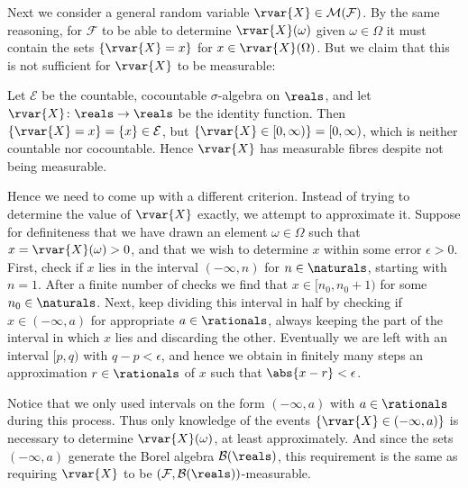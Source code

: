 \documentclass[article, a4paper, 11pt, oneside]{memoir}
\numberwithin{equation}{chapter}
\newcommand{\calB}{\mathcal{B}}
\newcommand{\calE}{\mathcal{E}}
\newcommand{\calF}{\mathcal{F}}
\newcommand{\borel}[1]{\calB(#1)}
\begin{document}
Next we consider a general random variable $\rvar{X} \in \meas{\calF}$. By the same reasoning, for $\calF$ to be able to determine $\rvar{X}(\omega)$ given $\omega \in \Omega$ it must contain the sets $\{\rvar{X} = x\}$ for $x \in \rvar{X}(\Omega)$. But we claim that this is not sufficient for $\rvar{X}$ to be measurable:
%
\begin{example}
    Let $\calE$ be the countable, cocountable $\sigma$-algebra on $\reals$, and let $\rvar{X} \colon \reals \to \reals$ be the identity function. Then $\{\rvar{X} = x\} = \{x\} \in \calE$, but $\{\rvar{X} \in [0,\infty)\} = [0, \infty)$, which is neither countable nor cocountable. Hence $\rvar{X}$ has measurable fibres despite not being measurable.
\end{example}
%
Hence we need to come up with a different criterion. Instead of trying to determine the value of $\rvar{X}$ exactly, we attempt to approximate it. Suppose for definiteness that we have drawn an element $\omega \in \Omega$ such that $x = \rvar{X}(\omega) > 0$, and that we wish to determine $x$ within some error $\epsilon > 0$. First, check if $x$ lies in the interval $(-\infty,n)$ for $n \in \naturals$, starting with $n = 1$. After a finite number of checks we find that $x \in [n_0, n_0+1)$ for some $n_0 \in \naturals$. Next, keep dividing this interval in half by checking if $x \in (-\infty, a)$ for appropriate $a \in \rationals$, always keeping the part of the interval in which $x$ lies and discarding the other. Eventually we are left with an interval $[p,q)$ with $q-p < \epsilon$, and hence we obtain in finitely many steps an approximation $r \in \rationals$ of $x$ such that $\abs{x-r} < \epsilon$.

Notice that we only used intervals on the form $(-\infty, a)$ with $a \in \rationals$ during this process. Thus only knowledge of the events $\{\rvar{X} \in (-\infty, a)\}$ is necessary to determine $\rvar{X}(\omega)$, at least approximately. And since the sets $(-\infty, a)$ generate the Borel algebra $\borel{\reals}$, this requirement is the same as requiring $\rvar{X}$ to be $(\calF,\borel{\reals})$-measurable.


\nocite{*}

\printbibliography
\end{document}
